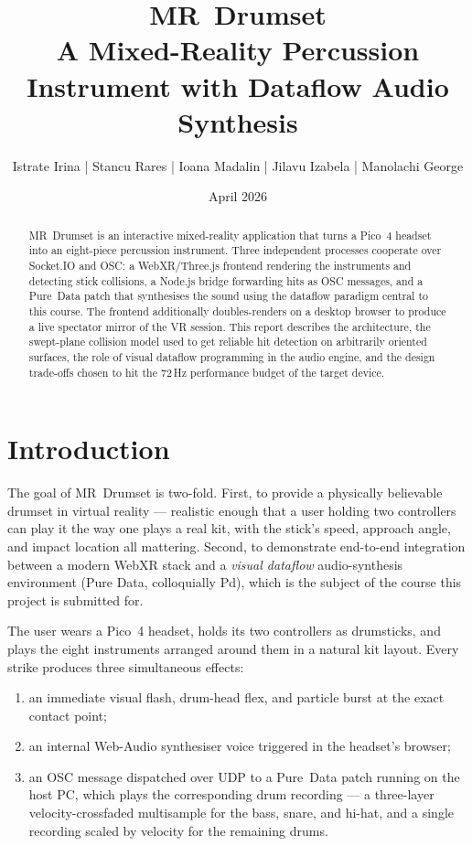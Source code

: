 \documentclass[11pt,a4paper]{article}
\title{\textbf{MR~Drumset}\\[0.3em]
\large A Mixed-Reality Percussion Instrument with Dataflow Audio Synthesis}
\author{ Istrate Irina | Stancu Rares | Ioana Madalin | Jilavu Izabela | Manolachi George }
\date{April 2026}
\begin{document}
\maketitle

\begin{abstract}
\noindent
MR~Drumset is an interactive mixed-reality application that turns a
Pico~4 headset into an eight-piece percussion instrument. Three
independent processes cooperate over Socket.IO and OSC: a
WebXR/Three.js frontend rendering the instruments and detecting stick
collisions, a Node.js bridge forwarding hits as OSC messages, and a
Pure~Data patch that synthesises the sound using the dataflow
paradigm central to this course. The frontend additionally
doubles-renders on a desktop browser to produce a live spectator
mirror of the VR session. This report describes the architecture, the
swept-plane collision model used to get reliable hit detection on
arbitrarily oriented surfaces, the role of visual dataflow
programming in the audio engine, and the design trade-offs chosen to
hit the 72\,Hz performance budget of the target device.
\end{abstract}

\tableofcontents
\newpage

\section{Introduction}

The goal of MR~Drumset is two-fold. First, to provide a physically
believable drumset in virtual reality --- realistic enough that a user
holding two controllers can play it the way one plays a real kit, with
the stick's speed, approach angle, and impact location all mattering.
Second, to demonstrate end-to-end integration between a modern
WebXR stack and a \emph{visual dataflow} audio-synthesis environment
(Pure Data, colloquially Pd), which is the subject of the course this
project is submitted for.

The user wears a Pico~4 headset, holds its two controllers as
drumsticks, and plays the eight instruments arranged around them in a
natural kit layout. Every strike produces three simultaneous effects:

\begin{enumerate}[leftmargin=2em]
    \item an immediate visual flash, drum-head flex, and particle
          burst at the exact contact point;
    \item an internal Web-Audio synthesiser voice triggered in the
          headset's browser;
    \item an OSC message dispatched over UDP to a Pure~Data patch
          running on the host PC, which plays the corresponding
          drum recording --- a three-layer velocity-crossfaded
          multisample for the bass, snare, and hi-hat, and a single
          recording scaled by velocity for the remaining drums.
\end{enumerate}
\end{document}
